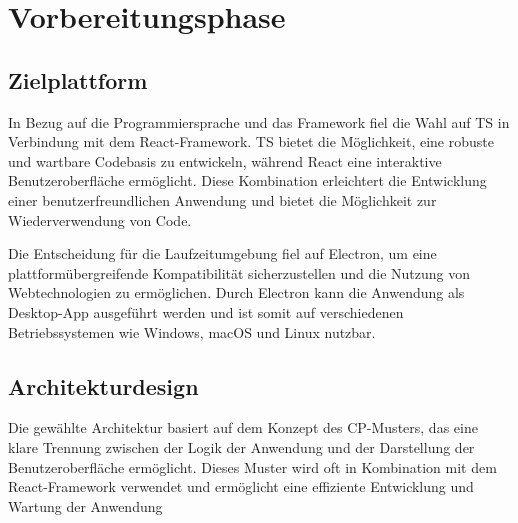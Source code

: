 \section{Vorbereitungsphase}
\label{sec:Vorbereitungsphase}

\subsection{Zielplattform}
\label{sec:Zielplattform}
In Bezug auf die Programmiersprache und das Framework fiel die Wahl auf \ac{TS} in Verbindung mit dem React-Framework.
\ac{TS} bietet die Möglichkeit, eine robuste und wartbare Codebasis zu entwickeln, während React eine interaktive Benutzeroberfläche ermöglicht.
Diese Kombination erleichtert die Entwicklung einer benutzerfreundlichen Anwendung und bietet die Möglichkeit zur Wiederverwendung von Code.


Die Entscheidung für die Laufzeitumgebung fiel auf Electron, um eine plattformübergreifende Kompatibilität sicherzustellen und die Nutzung von Webtechnologien zu ermöglichen.
Durch Electron kann die Anwendung als Desktop-App ausgeführt werden und ist somit auf verschiedenen Betriebssystemen wie Windows, macOS und Linux nutzbar.


\subsection{Architekturdesign}
\label{sec:Architekturdesign}
Die gewählte Architektur basiert auf dem Konzept des \ac{CP}-Musters, das eine klare Trennung zwischen der Logik der Anwendung und der Darstellung der Benutzeroberfläche ermöglicht.
Dieses Muster wird oft in Kombination mit dem React-Framework verwendet und ermöglicht eine effiziente Entwicklung und Wartung der Anwendung


